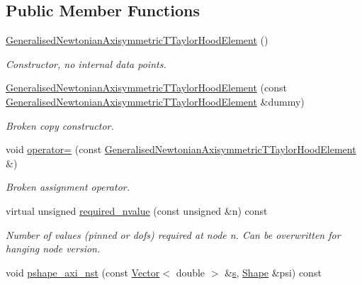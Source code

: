 \subsection*{Public Member Functions}
\begin{DoxyCompactItemize}
\item 
\hyperlink{classoomph_1_1GeneralisedNewtonianAxisymmetricTTaylorHoodElement_ae4fbd185f08a7eb900d86fed2d7e5921}{Generalised\+Newtonian\+Axisymmetric\+T\+Taylor\+Hood\+Element} ()
\begin{DoxyCompactList}\small\item\em Constructor, no internal data points. \end{DoxyCompactList}\item 
\hyperlink{classoomph_1_1GeneralisedNewtonianAxisymmetricTTaylorHoodElement_ab313ad665e9969c00b9e3612fe6d26af}{Generalised\+Newtonian\+Axisymmetric\+T\+Taylor\+Hood\+Element} (const \hyperlink{classoomph_1_1GeneralisedNewtonianAxisymmetricTTaylorHoodElement}{Generalised\+Newtonian\+Axisymmetric\+T\+Taylor\+Hood\+Element} \&dummy)
\begin{DoxyCompactList}\small\item\em Broken copy constructor. \end{DoxyCompactList}\item 
void \hyperlink{classoomph_1_1GeneralisedNewtonianAxisymmetricTTaylorHoodElement_a38d25c4d7f0e65079c61ad69b5d62567}{operator=} (const \hyperlink{classoomph_1_1GeneralisedNewtonianAxisymmetricTTaylorHoodElement}{Generalised\+Newtonian\+Axisymmetric\+T\+Taylor\+Hood\+Element} \&)
\begin{DoxyCompactList}\small\item\em Broken assignment operator. \end{DoxyCompactList}\item 
virtual unsigned \hyperlink{classoomph_1_1GeneralisedNewtonianAxisymmetricTTaylorHoodElement_a3605691c5cd063a0eed848f5f09465bb}{required\+\_\+nvalue} (const unsigned \&n) const
\begin{DoxyCompactList}\small\item\em Number of values (pinned or dofs) required at node n. Can be overwritten for hanging node version. \end{DoxyCompactList}\item 
void \hyperlink{classoomph_1_1GeneralisedNewtonianAxisymmetricTTaylorHoodElement_a6da92d71afc74c7341a5bf2cd39f2f45}{pshape\+\_\+axi\+\_\+nst} (const \hyperlink{classoomph_1_1Vector}{Vector}$<$ double $>$ \&\hyperlink{cfortran_8h_ab7123126e4885ef647dd9c6e3807a21c}{s}, \hyperlink{classoomph_1_1Shape}{Shape} \&psi) const

\end{DoxyCompactItemize}
